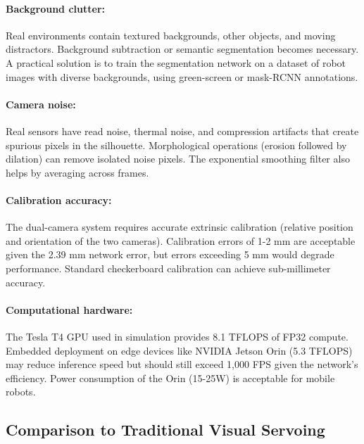 \documentclass[12pt,a4paper,oneside]{report}
\begin{document}
\paragraph{Background clutter:} Real environments contain textured backgrounds, other objects, and moving distractors. Background subtraction or semantic segmentation becomes necessary. A practical solution is to train the segmentation network on a dataset of robot images with diverse backgrounds, using green-screen or mask-RCNN annotations.

\paragraph{Camera noise:} Real sensors have read noise, thermal noise, and compression artifacts that create spurious pixels in the silhouette. Morphological operations (erosion followed by dilation) can remove isolated noise pixels. The exponential smoothing filter also helps by averaging across frames.

\paragraph{Calibration accuracy:} The dual-camera system requires accurate extrinsic calibration (relative position and orientation of the two cameras). Calibration errors of 1-2 mm are acceptable given the 2.39 mm network error, but errors exceeding 5 mm would degrade performance. Standard checkerboard calibration can achieve sub-millimeter accuracy.

\paragraph{Computational hardware:} The Tesla T4 GPU used in simulation provides 8.1 TFLOPS of FP32 compute. Embedded deployment on edge devices like NVIDIA Jetson Orin (5.3 TFLOPS) may reduce inference speed but should still exceed 1,000 FPS given the network's efficiency. Power consumption of the Orin (15-25W) is acceptable for mobile robots.

\subsection{Comparison to Traditional Visual Servoing}
\end{document}
